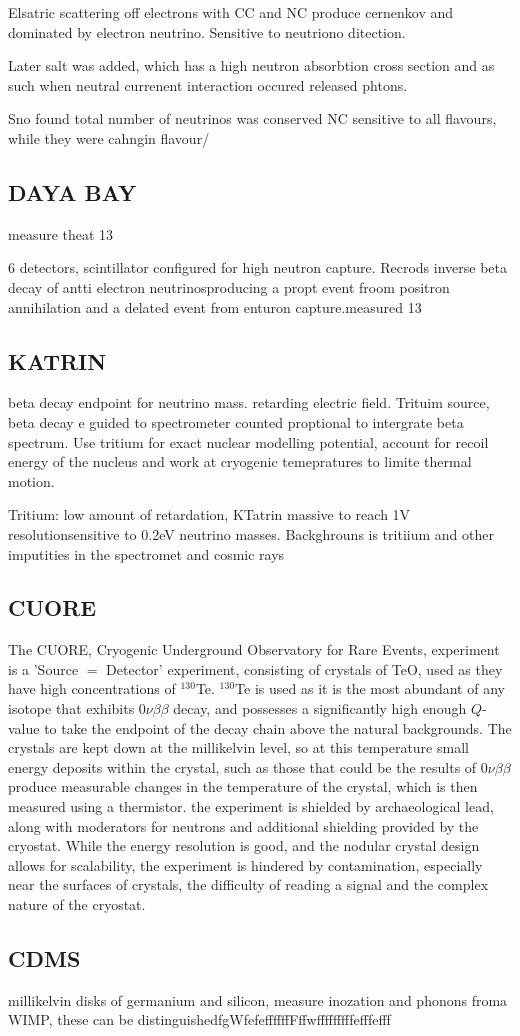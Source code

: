 \documentclass[]{article}
\begin{document}
Elsatric scattering off electrons with CC and NC produce cernenkov and dominated by electron neutrino. Sensitive to neutriono ditection.

Later salt was added, which has a high neutron absorbtion cross section and as such when neutral currenent interaction occured released phtons. 

Sno found total number of neutrinos was conserved NC sensitive to all flavours, while they were cahngin flavour/

\subsection{DAYA BAY}
measure theat 13

6 detectors, scintillator configured for high neutron capture. Recrods inverse beta decay of antti electron neutrinosproducing a propt event froom positron annihilation and a delated event from enturon capture.measured 13 

\subsection{KATRIN}
 
 beta decay endpoint  for neutrino mass. retarding electric field. Trituim source, beta decay e guided to spectrometer counted proptional to intergrate beta spectrum. Use tritium for exact nuclear modelling potential, account for recoil energy of the nucleus and work at cryogenic temepratures to limite thermal motion.
 
 Tritium: low amount of retardation, KTatrin massive to reach 1V resolutionsensitive to 0.2eV neutrino masses. Backghrouns is tritiium and other imputities in the spectromet and cosmic rays
 
 \subsection{CUORE}
 		The CUORE, Cryogenic Underground Observatory for Rare Events, experiment is a 		'Source $=$ Detector' experiment, consisting of crystals of TeO, used as they have high concentrations of $^{130}$Te.  $^{130}$Te is used as it is the most abundant of any isotope that exhibits $0\nu\beta\beta$ decay, and possesses a significantly high enough $Q$-value to take the endpoint of the decay chain above the natural backgrounds. The crystals are kept down at the millikelvin level, so at this temperature small energy deposits within the crystal, such as those that could be the results of $0\nu\beta\beta$ produce measurable changes in the temperature of the crystal, which is then measured using a thermistor. the experiment is shielded by archaeological lead, along with moderators for neutrons and additional shielding provided by the cryostat. While the energy resolution is good, and the nodular crystal design allows for scalability, the experiment is hindered by contamination, especially near the surfaces of crystals, the difficulty of reading a signal and the complex nature of the cryostat.
 		
 		\subsection{CDMS} 
 		
 		millikelvin disks of germanium and silicon, measure inozation and phonons froma WIMP, these can be distinguishedfgWfefeffffffFffwfffffffffefffefff
 		
\end{document}
